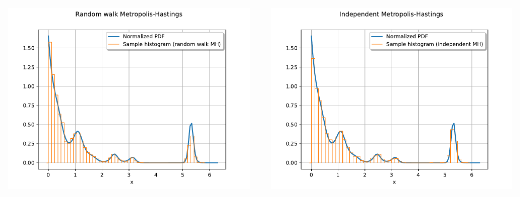 \documentclass{beamer}
\begin{document}
\begin{frame}[containsverbatim]
\begin{columns}
    \begin{column}{0.46\textwidth}
        \includegraphics[width=\textwidth]{figures/randomwalkMH}
    \end{column}
    \begin{column}{0.46\textwidth}
        \includegraphics[width=\textwidth]{figures/independentMH}
    \end{column}
\end{columns}
\end{frame}

\end{document}

